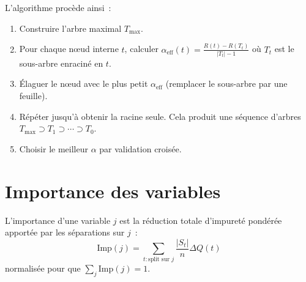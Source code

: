 L'algorithme proc\`ede ainsi~:
\begin{enumerate}
  \item Construire l'arbre maximal $T_{\max}$.
  \item Pour chaque n\oe{}ud interne $t$, calculer
    $\alpha_{\text{eff}}(t) = \frac{R(t) - R(T_t)}{|T_t| - 1}$ o\`u $T_t$
    est le sous-arbre enracin\'e en $t$.
  \item \'Elaguer le n\oe{}ud avec le plus petit $\alpha_{\text{eff}}$
    (remplacer le sous-arbre par une feuille).
  \item R\'ep\'eter jusqu'\`a obtenir la racine seule. Cela produit une
    s\'equence d'arbres $T_{\max} \supset T_1 \supset \cdots \supset T_0$.
  \item Choisir le meilleur $\alpha$ par validation crois\'ee.
\end{enumerate}

\begin{center}
\end{center}

\section{Importance des variables}
\label{sec:feature-importance}

\begin{definition}
L'importance d'une variable $j$ est la r\'eduction totale d'impuret\'e
pond\'er\'ee apport\'ee par les s\'eparations sur $j$~:
\begin{equation}
  \text{Imp}(j) = \sum_{t : \text{split sur } j}
  \frac{|S_t|}{n} \Delta Q(t)
\end{equation}
normalis\'ee pour que $\sum_j \text{Imp}(j) = 1$.
\end{definition}

